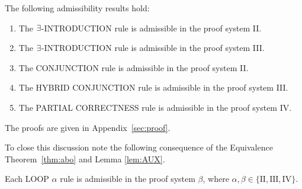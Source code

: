 \documentclass[manuscript, screen, review]{acmart}
\begin{document}
\begin{lemma}[Admissibility] \label{lem:admissibility}
The following admissibility results hold:


 \begin{enumerate} [$(i)$] 
    
   \item The $\mbox{$\exists$}$-{\rm INTRODUCTION} rule is admissible in the proof system {\rm II}. 
   
    \vspace{2mm}
        
   \item The $\mbox{$\exists$}$-{\rm INTRODUCTION} rule is admissible in the proof system {\rm III}.
   
    \vspace{2mm}
  
   \item The {\rm CONJUNCTION} rule is admissible in the proof system {\rm II}.
   
    \vspace{2mm}

   \item The {\rm HYBRID CONJUNCTION} rule is admissible in the proof system {\rm III}.
         
    \vspace{2mm}
         
   \item The {\rm PARTIAL CORRECTNESS} rule is admissible in the proof system {\rm IV}.
   
   

 \end{enumerate}

\end{lemma}

The proofs are given in
Appendix~\ref{sec:proof}.



To close this discussion note the following consequence of the Equivalence Theorem~\ref{thm:abo}
and Lemma \ref{lem:AUX}.

\begin{corollary} \label{corr:admiss}
Each {\rm LOOP} $\alpha$ rule is admissible in the proof system $\beta$, 
        where $\alpha, \beta \in \{\mathrm{II, III, IV}\}$.
\end{corollary}
\end{document}
